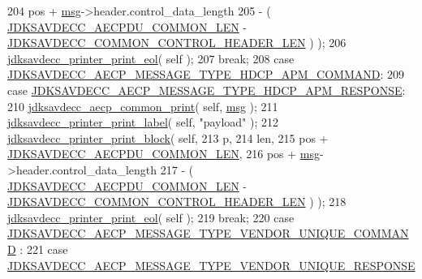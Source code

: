 \begin{DoxyCode}
204                                         pos + \hyperlink{maap__log__linux_8c_a0c7e58a50354c4a4d6dad428d0e47029}{msg}->header.control\_data\_length
205                                         - ( \hyperlink{group__aecpdu_ga1311febb873dfac7b4035ed25460f9d1}{JDKSAVDECC\_AECPDU\_COMMON\_LEN} - 
      \hyperlink{group__jdksavdecc__avtp__common__control__header_gaae84052886fb1bb42f3bc5f85b741dff}{JDKSAVDECC\_COMMON\_CONTROL\_HEADER\_LEN} ) );
206         \hyperlink{group__util_gacda56c9d3d24593a52c999682fa6e6e3}{jdksavdecc\_printer\_print\_eol}( \textcolor{keyword}{self} );
207         \textcolor{keywordflow}{break};
208     \textcolor{keywordflow}{case} \hyperlink{group__aecp__message__type_gad8bc8a9baa1622bd8eb8077cfc7683da}{JDKSAVDECC\_AECP\_MESSAGE\_TYPE\_HDCP\_APM\_COMMAND}:
209     \textcolor{keywordflow}{case} \hyperlink{group__aecp__message__type_gabea02eb162583796abf33a90b4f7bc4f}{JDKSAVDECC\_AECP\_MESSAGE\_TYPE\_HDCP\_APM\_RESPONSE}:
210         \hyperlink{group__aecp__print_gabf23e817595afca199205bb410a5eca6}{jdksavdecc\_aecp\_common\_print}( \textcolor{keyword}{self}, \hyperlink{maap__log__linux_8c_a0c7e58a50354c4a4d6dad428d0e47029}{msg} );
211         \hyperlink{group__util_gaf7818b24143b3c7502926a425a242ff5}{jdksavdecc\_printer\_print\_label}( \textcolor{keyword}{self}, \textcolor{stringliteral}{"payload"} );
212         \hyperlink{group__util_ga18d7b11e396f21996dedde77febcb22f}{jdksavdecc\_printer\_print\_block}( \textcolor{keyword}{self},
213                                         p,
214                                         len,
215                                         pos + \hyperlink{group__aecpdu_ga1311febb873dfac7b4035ed25460f9d1}{JDKSAVDECC\_AECPDU\_COMMON\_LEN},
216                                         pos + \hyperlink{maap__log__linux_8c_a0c7e58a50354c4a4d6dad428d0e47029}{msg}->header.control\_data\_length
217                                         - ( \hyperlink{group__aecpdu_ga1311febb873dfac7b4035ed25460f9d1}{JDKSAVDECC\_AECPDU\_COMMON\_LEN} - 
      \hyperlink{group__jdksavdecc__avtp__common__control__header_gaae84052886fb1bb42f3bc5f85b741dff}{JDKSAVDECC\_COMMON\_CONTROL\_HEADER\_LEN} ) );
218         \hyperlink{group__util_gacda56c9d3d24593a52c999682fa6e6e3}{jdksavdecc\_printer\_print\_eol}( \textcolor{keyword}{self} );
219         \textcolor{keywordflow}{break};
220     \textcolor{keywordflow}{case} \hyperlink{group__aecp__message__type_gacab73895959eb753b503adc28096fdd5}{JDKSAVDECC\_AECP\_MESSAGE\_TYPE\_VENDOR\_UNIQUE\_COMMAND}
      :
221     \textcolor{keywordflow}{case} \hyperlink{group__aecp__message__type_ga0ae19013f80cab20e33bdc804b7f1364}{JDKSAVDECC\_AECP\_MESSAGE\_TYPE\_VENDOR\_UNIQUE\_RESPONSE}

\end{DoxyCode}
